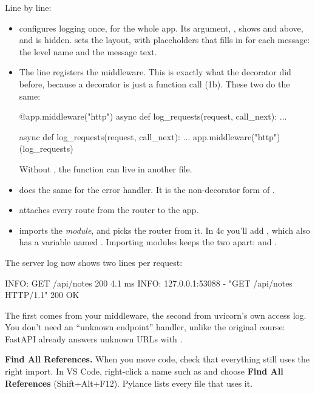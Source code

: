 Line by line:
\begin{itemize}
\item {} configures logging once, for the whole app. Its  argument, , shows  and above, and  is hidden.  sets the layout, with placeholders that  fills in for each message: the level name and the message text.
\item The  line registers the middleware. This is exactly what the decorator did before, because a decorator is just a function call (1b). These two do the same:
\begin{py}
@app.middleware("http")
async def log_requests(request, call_next): ...

async def log_requests(request, call_next): ...
app.middleware("http")(log_requests)
\end{py}
Without , the function can live in another file.
\item {} does the same for the error handler. It is the non-decorator form of .
\item {} attaches every route from the router to the app.
\item {} imports the \emph{module}, and  picks the router from it. In 4c you'll add , which also has a variable named . Importing modules keeps the two apart:  and .
\end{itemize}

The server log now shows two lines per request:

\begin{code}
INFO: GET /api/notes 200 4.1 ms
INFO:     127.0.0.1:53088 - "GET /api/notes HTTP/1.1" 200 OK
\end{code}

The first comes from your middleware, the second from uvicorn's own access log. You don't need an ``unknown endpoint'' handler, unlike the original course: FastAPI already answers unknown URLs with .

\textbf{Find All References.} When you move code, check that everything still uses the right import. In VS Code, right-click a name such as  and choose \textbf{Find All References} (Shift+Alt+F12). Pylance lists every file that uses it.

